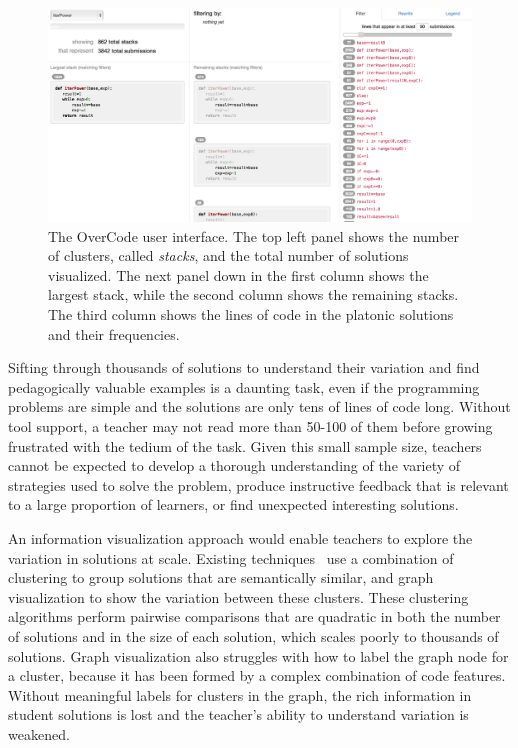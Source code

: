 \begin{figure}[t!]
\centering
\includegraphics[width=1.0\linewidth]{Body/figures/overcode/interfaceScreenShot.png}
\caption{The OverCode user interface. The top left panel shows the number of clusters, called {\it stacks}, and the total number of solutions visualized. The next panel down in the first column shows the largest stack, while the second column shows the remaining stacks. The third column shows the lines of code in the platonic solutions and their frequencies.}
\label{overcode_fullinterface}
\end{figure}

Sifting through thousands of solutions to understand their variation and find pedagogically valuable examples is a daunting task, even if the programming problems are simple and the solutions are only tens of lines of code long. Without tool support, a teacher may not read more than 50-100 of them before growing frustrated with the tedium of the task. Given this small sample size, teachers cannot be expected to develop a thorough understanding of the variety of strategies used to solve the problem, produce instructive feedback that is relevant to a large proportion of learners, or find unexpected interesting solutions.

An information visualization approach would enable teachers to explore the variation in solutions at scale. Existing techniques~\cite{gradingsigcse14,MOOCshop,codewebs} use a combination of clustering to group solutions that are semantically similar, and graph visualization to show the variation between these clusters. These clustering algorithms perform pairwise comparisons that are quadratic in both the number of solutions and in the size of each solution, which scales poorly to thousands of solutions. Graph visualization also struggles with how to label the graph node for a cluster, because it has been formed by a complex combination of code features. Without meaningful labels for clusters in the graph, the rich information in student solutions is lost and the teacher's ability to understand variation is weakened.

